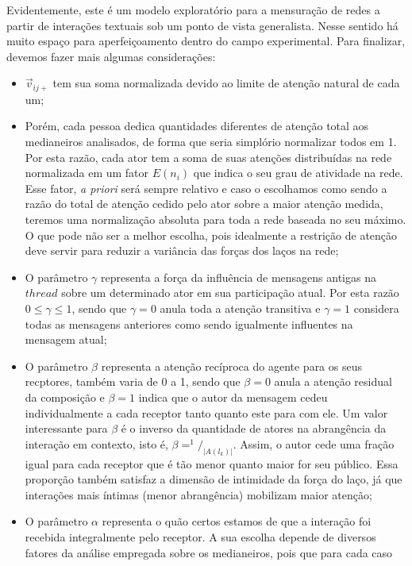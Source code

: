 \documentclass{article}
\begin{document}
Evidentemente, este é um modelo exploratório para a mensuração de redes a partir
de interações textuais sob um ponto de vista generalista. Nesse sentido há muito
espaço para aperfeiçoamento dentro do campo experimental. Para finalizar,
devemos fazer mais algumas considerações:
\begin{itemize}
  \item $\vec{v}_{ij+}$ tem sua soma normalizada devido ao limite de atenção
  natural de cada um;
  \item Porém, cada pessoa dedica quantidades diferentes de atenção total aos
  medianeiros analisados, de forma que seria simplório normalizar todos em 1.
  Por esta razão, cada ator tem a soma de suas atenções distribuídas na rede
  normalizada em um fator $E(n_i)$ que indica o seu grau de atividade na rede.
  Esse fator, \textit{a priori} será sempre relativo e caso o escolhamos como
  sendo a razão do total de atenção cedido pelo ator sobre a maior atenção
  medida, teremos uma normalização absoluta para toda a rede baseada no seu
  máximo. O que pode não ser a melhor escolha, pois idealmente a restrição de
  atenção deve servir para reduzir a variância das forças dos laços na rede;
  \item O parâmetro $\gamma$ representa a força da influência de mensagens
  antigas na $thread$ sobre um determinado ator em sua participação atual. Por
  esta razão $0 \leq \gamma \leq 1$, sendo que $\gamma=0$ anula toda a atenção
  transitiva e $\gamma=1$ considera todas as mensagens anteriores como sendo
  igualmente influentes na mensagem atual;
  \item O parâmetro $\beta$ representa a atenção recíproca do agente para os
  seus recptores, também varia de 0 a 1, sendo que $\beta=0$ anula a atenção
  residual da composição e $\beta=1$ indica que o autor da mensagem cedeu
  individualmente a cada receptor tanto quanto este para com ele. Um valor
  interessante para $\beta$ é o inverso da quantidade de atores na abrangência
  da interação em contexto, isto é, $\beta=^1/_{|A(l_k)|}$. Assim, o autor cede
  uma fração igual para cada receptor que é tão menor quanto maior for seu
  público. Essa proporção também satisfaz a dimensão de intimidade da força do
  laço, já que interações mais íntimas (menor abrangência) mobilizam maior
  atenção;
  \item O parâmetro $\alpha$ representa o quão certos estamos de que a interação
  foi recebida integralmente pelo receptor. A sua escolha depende de diversos
  fatores da análise empregada sobre os medianeiros, pois que para cada caso

\end{itemize}
\end{document}
